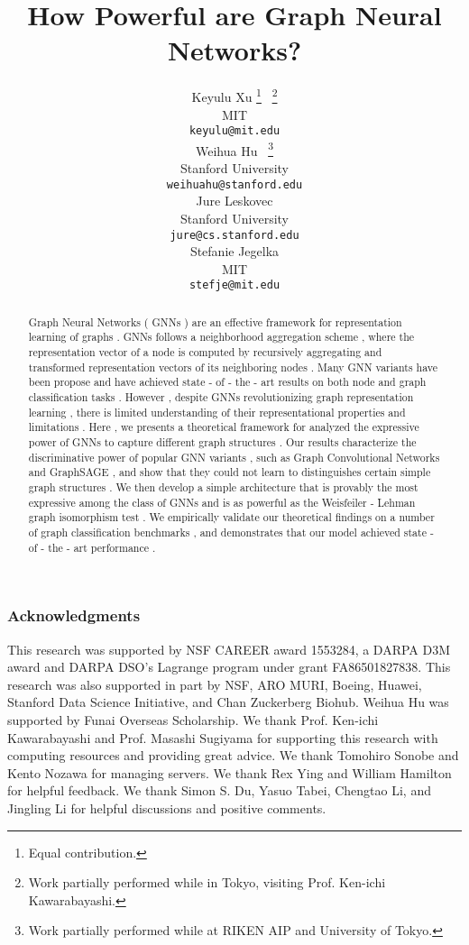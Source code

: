 \documentclass{article} %
\title{How Powerful are Graph Neural Networks?}
\author{Keyulu Xu  \thanks{Equal contribution.} \ \thanks{Work partially performed while in Tokyo, visiting Prof. Ken-ichi Kawarabayashi.} \\
MIT\\
\texttt{keyulu@mit.edu} \\
\And
Weihua Hu \footnotemark[1] \ \thanks{Work partially performed while at RIKEN AIP and University of Tokyo.} \\
Stanford University \\
\texttt{weihuahu@stanford.edu} \\
\And
Jure Leskovec\\
Stanford University \\
\texttt{jure@cs.stanford.edu}\\
\And
Stefanie Jegelka\\
MIT\\
\texttt{stefje@mit.edu} \\
}
\numberwithin{equation}{section}
\theoremstyle{plain}
\theoremstyle{definition}
\theoremstyle{remark}
\begin{document}
\maketitle

\begin{abstract}
Graph Neural Networks ( GNNs ) are an effective framework for representation learning of graphs . GNNs follows a neighborhood aggregation scheme , where the representation vector of a node is computed by recursively aggregating and transformed representation vectors of its neighboring nodes . Many GNN variants have been propose and have achieved state - of - the - art results on both node and graph classification tasks . However , despite GNNs revolutionizing graph representation learning , there is limited understanding of their representational properties and limitations . Here , we presents a theoretical framework for analyzed the expressive power of GNNs to capture different graph structures . Our results characterize the discriminative power of popular GNN variants , such as Graph Convolutional Networks and GraphSAGE , and show that they could not learn to distinguishes certain simple graph structures . We then develop a simple architecture that is provably the most expressive among the class of GNNs and is as powerful as the Weisfeiler - Lehman graph isomorphism test . We empirically validate our theoretical findings on a number of graph classification benchmarks , and demonstrates that our model achieved state - of - the - art performance . \end{abstract}

















\subsubsection*{Acknowledgments}
This research was supported by NSF CAREER award 1553284, a DARPA D3M award and DARPA DSO’s Lagrange program under grant FA86501827838. This research was also supported in part by
NSF, ARO MURI, 
Boeing, Huawei, Stanford Data Science Initiative,
and Chan Zuckerberg Biohub. 
Weihua Hu was supported by Funai Overseas Scholarship. We thank Prof. Ken-ichi Kawarabayashi and Prof. Masashi Sugiyama for supporting this research with computing resources and providing great advice. We thank Tomohiro Sonobe and Kento Nozawa for managing servers. We thank Rex Ying and William Hamilton for helpful feedback. We thank Simon S. Du, Yasuo Tabei, Chengtao Li, and Jingling Li for helpful discussions and positive comments.






\end{document}
